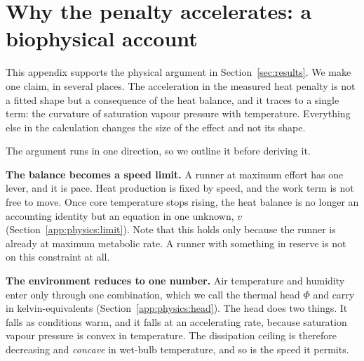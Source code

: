 \section{Why the penalty accelerates: a biophysical account}
\label{app:physics}
\label{sec:convexity}

This appendix supports the physical argument in Section~\ref{sec:results}. We
make one claim, in several places. The acceleration in the measured heat penalty
is not a fitted shape but a consequence of the heat balance, and it traces to a
single term: the curvature of saturation vapour pressure with temperature.
Everything else in the calculation changes the size of the effect and not its
shape.

The argument runs in one direction, so we outline it before deriving it.

\textbf{The balance becomes a speed limit.} A runner at maximum effort has one
lever, and it is pace. Heat production is fixed by speed, and the work term is
not free to move. Once core temperature stops rising, the heat balance is no
longer an accounting identity but an equation in one unknown, $v$
(Section~\ref{app:physics:limit}). Note that this holds only because the runner
is already at maximum metabolic rate. A runner with something in reserve is not
on this constraint at all.

\textbf{The environment reduces to one number.} Air temperature and humidity
enter only through one combination, which we call the thermal head $\Phi$ and
carry in kelvin-equivalents (Section~\ref{app:physics:head}). The head does two
things. It falls as conditions warm, and it falls at an accelerating rate,
because saturation vapour pressure is convex in temperature. The dissipation
ceiling is therefore decreasing and \emph{concave} in wet-bulb temperature, and
so is the speed it permits.

